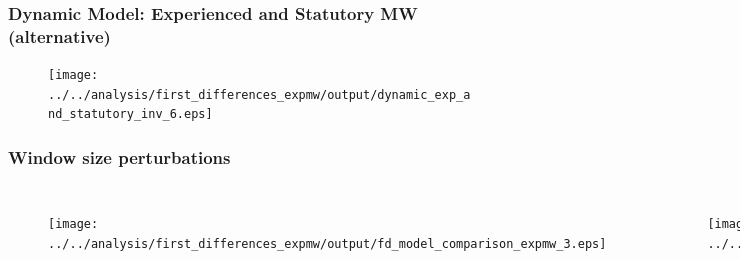 \begin{frame}[label = dyn_both_alt]
	\frametitle{Dynamic Model: Experienced and Statutory MW (alternative)}
	\begin{figure} \centering
		\texttt{[image: ../../analysis/first\_differences\_expmw/output/dynamic\_exp\_and\_statutory\_inv\_6.eps]}
	\end{figure}

	\vspace{-2mm}
	\hyperlink{dyn_both}{}
\end{frame}

\begin{frame}[label = window_size_perturbations]
	\frametitle{Window size perturbations}
	
	\begin{columns}
		\begin{figure}[H]
			\centering
			\texttt{[image: ../../analysis/first\_differences\_expmw/output/fd\_model\_comparison\_expmw\_3.eps]}
		\end{figure}
		
		\begin{figure}[H]
			\centering
			\texttt{[image: ../../analysis/first\_differences\_expmw/output/fd\_model\_comparison\_expmw\_9.eps]}
		\end{figure}
	\end{columns}

	\hyperlink{dyn_comp}{}
\end{frame}
